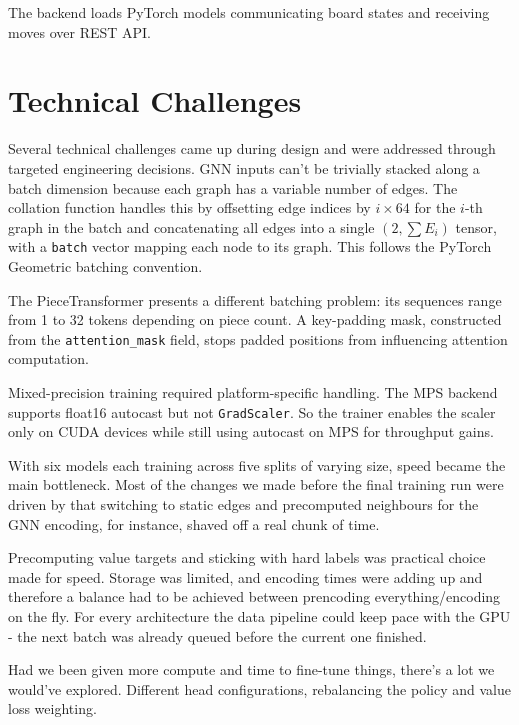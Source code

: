 The backend loads PyTorch models communicating board states and receiving moves over REST API.

\section{Technical Challenges}

Several technical challenges came up during design and were addressed through targeted engineering decisions.
GNN inputs can't be trivially stacked along a batch dimension because each graph has a variable number of edges. The collation function handles this by offsetting edge indices by $i \times 64$ for the $i$-th graph in the batch and concatenating all edges into a single $(2, \sum E_i)$ tensor, with a \texttt{batch} vector mapping each node to its graph. This follows the PyTorch Geometric batching convention.

The PieceTransformer presents a different batching problem: its sequences range from 1 to 32 tokens depending on piece count. A key-padding mask, constructed from the \texttt{attention\_mask} field, stops padded positions from influencing attention computation.

Mixed-precision training required platform-specific handling. The MPS backend supports float16 autocast but not \texttt{GradScaler}. So the trainer enables the scaler only on CUDA devices while still using autocast on MPS for throughput gains.

With six models each training across five splits of varying size, speed became the main bottleneck. Most of the changes we made before the final training run were driven by that switching to static edges and precomputed neighbours for the GNN encoding, for instance, shaved off a real chunk of time.

Precomputing value targets and sticking with hard labels was practical choice made for speed. Storage was limited, and encoding times were adding up and therefore a balance had to be achieved between prencoding everything/encoding on the fly. For every architecture the data pipeline could keep pace with the GPU - the next batch was already queued before the current one finished.

Had we been given more compute and time to fine-tune things, there's a lot we would've explored. Different head configurations, rebalancing the policy and value loss weighting.

